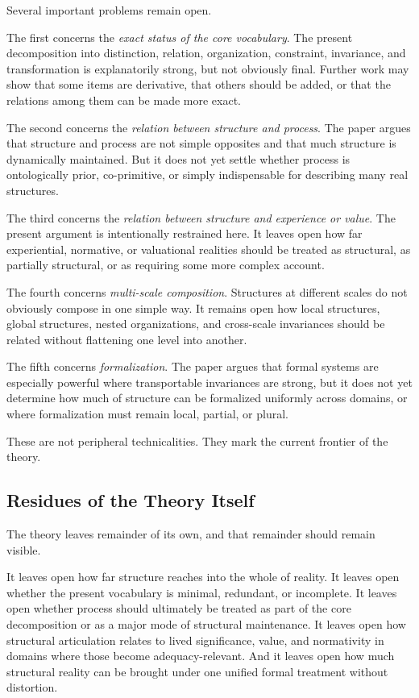 \documentclass[11pt]{article}
\renewcommand{\emph}[1]{\textit{#1}}
\begin{document}
Several important problems remain open.

The first concerns the \emph{exact status of the core vocabulary}. The present decomposition into distinction, relation, organization, constraint, invariance, and transformation is explanatorily strong, but not obviously final. Further work may show that some items are derivative, that others should be added, or that the relations among them can be made more exact.

The second concerns the \emph{relation between structure and process}. The paper argues that structure and process are not simple opposites and that much structure is dynamically maintained. But it does not yet settle whether process is ontologically prior, co-primitive, or simply indispensable for describing many real structures.

The third concerns the \emph{relation between structure and experience or value}. The present argument is intentionally restrained here. It leaves open how far experiential, normative, or valuational realities should be treated as structural, as partially structural, or as requiring some more complex account.

The fourth concerns \emph{multi-scale composition}. Structures at different scales do not obviously compose in one simple way. It remains open how local structures, global structures, nested organizations, and cross-scale invariances should be related without flattening one level into another.

The fifth concerns \emph{formalization}. The paper argues that formal systems are especially powerful where transportable invariances are strong, but it does not yet determine how much of structure can be formalized uniformly across domains, or where formalization must remain local, partial, or plural.

These are not peripheral technicalities. They mark the current frontier of the theory.

\subsection{Residues of the Theory Itself}

The theory leaves remainder of its own, and that remainder should remain visible.

It leaves open how far structure reaches into the whole of reality. It leaves open whether the present vocabulary is minimal, redundant, or incomplete. It leaves open whether process should ultimately be treated as part of the core decomposition or as a major mode of structural maintenance. It leaves open how structural articulation relates to lived significance, value, and normativity in domains where those become adequacy-relevant. And it leaves open how much structural reality can be brought under one unified formal treatment without distortion.
\end{document}
